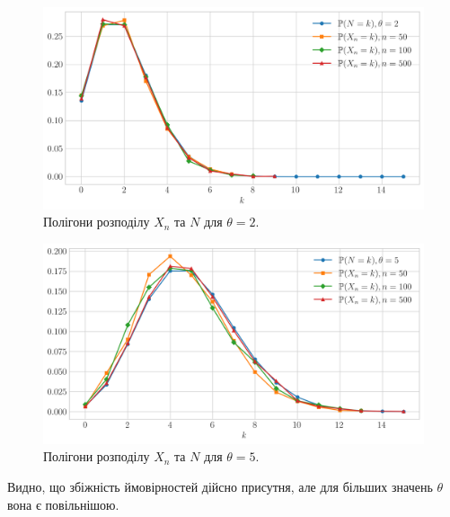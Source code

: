 \begin{figure}[H]
    \centering
    \includegraphics[scale=0.6]{plots/fp_prob_theta_2.png}
    \caption{Полігони розподілу $X_n$ та $N$ для $\theta = 2$.}
\end{figure}

\begin{figure}[H]
    \centering
    \includegraphics[scale=0.6]{plots/fp_prob_theta_5.png}
    \caption{Полігони розподілу $X_n$ та $N$ для $\theta = 5$.}
\end{figure}

Видно, що збіжність ймовірностей дійсно присутня, але для більших
значень $\theta$ вона є повільнішою.